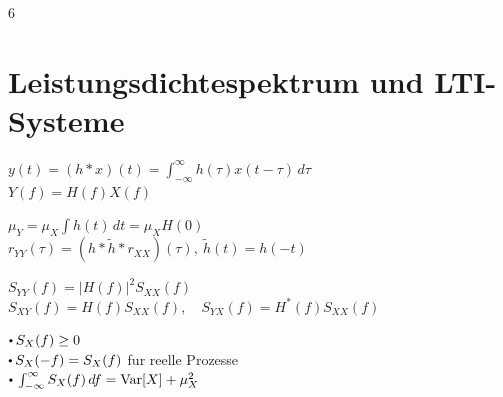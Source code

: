 \documentclass[8pt,a4paper,landscape]{extarticle}
\begin{document}
\begin{multicols*}{6}
\section{Leistungsdichtespektrum und LTI-Systeme}


$y(t)=(h*x)(t)=\int_{-\infty}^{\infty}h(\tau)x(t-\tau)\,d\tau$ \\
$Y(f)=H(f)X(f)$


$\mu_Y = \mu_X \int h(t)\,dt = \mu_XH(0)$ \\
$r_{YY}(\tau) = (h*\tilde h*r_{XX})(\tau),\ \tilde h(t)=h(-t)$


$S_{YY}(f)=|H(f)|^2S_{XX}(f)$ \\
$S_{XY}(f)=H(f)S_{XX}(f),\quad S_{YX}(f)=H^*(f)S_{XX}(f)$


$\sbullet S_X(f)\ge 0$ \\
$\sbullet S_X(-f)=S_X(f)$ fur reelle Prozesse \\
$\sbullet \int_{-\infty}^{\infty} S_X(f)\,df = \operatorname{Var}[X] + \mu_X^2$








\end{multicols*}
\end{document}
